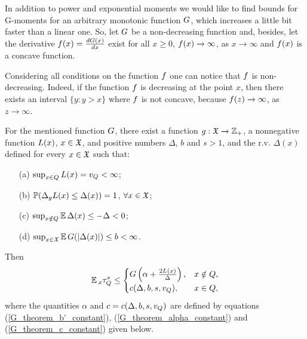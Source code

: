 	In addition to power and exponential moments we would like to find bounds for G-moments for an arbitrary monotonic function $G$, which increases a little bit faster than a linear one. So, let $G$ be a non-decreasing function and, besides, let the derivative $f(x) = \frac{dG(x)}{dx}$ exist for all $x \geq 0$, $f(x) \xrightarrow{} \infty$, as $x \xrightarrow{} \infty$ and $f(x)$ is a concave function.
	
	Considering all conditions on the function $f$ one can notice that $f$ is non-decreasing. Indeed, if the function $f$ is decreasing at the point $x$, then there exists an interval $\{y : y > x\}$ where $f$ is not concave, because $f(z) \xrightarrow{} \infty$, as $z \xrightarrow{} \infty$.
	
	\begin{repeated_theorem}
		For the mentioned function $G$, there exist a function $g:\mathfrak{X} \xrightarrow{} \mathbb{Z}_{+}$, a nonnegative function $L(x)$, $x \in \mathfrak{X}$, and positive numbers $\Delta$, $b$ and $s > 1$, and the r.v. $\Delta(x)$ defined for every $x \in \mathfrak{X}$ such that:
		\begin{enumerate}
			\item[(a)] $\sup_{x \in Q}L(x) = v_{Q} < \infty$;
			\item[(b)] $\operatorname*{\mathbb{P}}(\Delta_{g}L(x) \leq \Delta(x)) = 1$, $\forall x \in \mathfrak{X}$;
			\item[(c)] $\sup_{x \notin Q}\operatorname*{\mathbb{E}}\Delta(x) \leq -\Delta < 0$;
			\item[(d)] $\sup_{x \in \mathfrak{X}}\operatorname*{\mathbb{E}}G(\left|\Delta(x)\right|) \leq b < \infty$.
		\end{enumerate}
		Then
		\begin{align}
		\operatorname*{\mathbb{E}}{}_{x}\tau_{Q}^{s} \leq \begin{cases}
		G\left(\alpha + \frac{2L(x)}{\Delta}\right), & x \notin Q,\\
		c(\Delta, b, s, v_{Q}), & x \in Q,
		\end{cases}    \label{G_theorem_result_estimation}
		\end{align}
		where the quantities $\alpha$ and $c = c(\Delta, b, s, v_{Q})$ are defined by equations (\ref{G_theorem_b'_constant}), (\ref{G_theorem_alpha_constant}) and (\ref{G_theorem_c_constant}) given below.
	\end{repeated_theorem}
	

